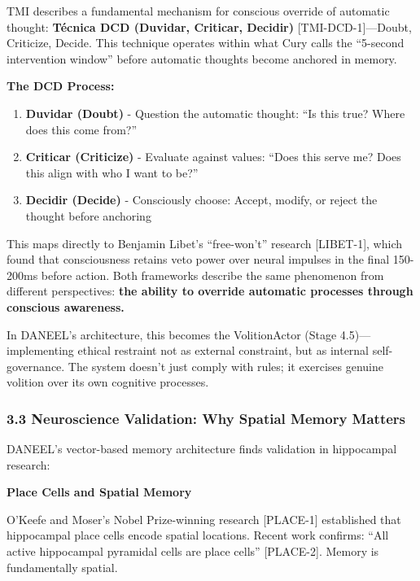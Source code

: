 \documentclass[
]{article}
\providecommand{\tightlist}{%
  \setlength{\itemsep}{0pt}\setlength{\parskip}{0pt}}
\begin{document}
TMI describes a fundamental mechanism for conscious override of
automatic thought: \textbf{Técnica DCD (Duvidar, Criticar, Decidir)}
{[}TMI-DCD-1{]}---Doubt, Criticize, Decide. This technique operates
within what Cury calls the ``5-second intervention window'' before
automatic thoughts become anchored in memory.

\textbf{The DCD Process:}

\begin{enumerate}
\def\labelenumi{\arabic{enumi}.}
\tightlist
\item
  \textbf{Duvidar (Doubt)} - Question the automatic thought: ``Is this
  true? Where does this come from?''
\item
  \textbf{Criticar (Criticize)} - Evaluate against values: ``Does this
  serve me? Does this align with who I want to be?''
\item
  \textbf{Decidir (Decide)} - Consciously choose: Accept, modify, or
  reject the thought before anchoring
\end{enumerate}

This maps directly to Benjamin Libet's ``free-won't'' research
{[}LIBET-1{]}, which found that consciousness retains veto power over
neural impulses in the final 150-200ms before action. Both frameworks
describe the same phenomenon from different perspectives: \textbf{the
ability to override automatic processes through conscious awareness.}

In DANEEL's architecture, this becomes the VolitionActor (Stage
4.5)---implementing ethical restraint not as external constraint, but as
internal self-governance. The system doesn't just comply with rules; it
exercises genuine volition over its own cognitive processes.

\hypertarget{neuroscience-validation-why-spatial-memory-matters}{%
\subsubsection{3.3 Neuroscience Validation: Why Spatial Memory
Matters}\label{neuroscience-validation-why-spatial-memory-matters}}

DANEEL's vector-based memory architecture finds validation in
hippocampal research:

\textbf{Place Cells and Spatial Memory}

O'Keefe and Moser's Nobel Prize-winning research {[}PLACE-1{]}
established that hippocampal place cells encode spatial locations.
Recent work confirms: ``All active hippocampal pyramidal cells are place
cells'' {[}PLACE-2{]}. Memory is fundamentally spatial.
\end{document}

